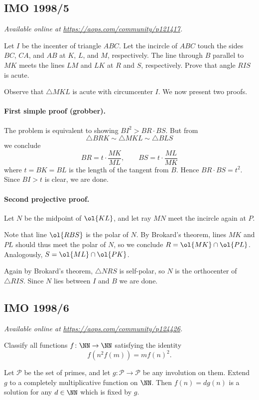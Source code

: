 \documentclass[11pt]{scrartcl}
\begin{document}
\subsection{IMO 1998/5}
\textsl{Available online at \url{https://aops.com/community/p121417}.}
\begin{mdframed}[style=mdpurplebox,frametitle={Problem statement}]
Let $I$ be the incenter of triangle $ABC$.
Let the incircle of $ABC$ touch
the sides $BC$, $CA$, and $AB$ at $K$, $L$, and $M$, respectively.
The line through $B$ parallel to $MK$ meets the lines
$LM$ and $LK$ at $R$ and $S$, respectively.
Prove that angle $RIS$ is acute.
\end{mdframed}
Observe that $\triangle MKL$ is acute with circumcenter $I$.
We now present two proofs.

\paragraph{First simple proof (grobber).}
The problem is equivalent to showing $BI^2 > BR \cdot BS$.
But from
\[ \triangle BRK \sim \triangle MKL \sim \triangle BLS \]
we conclude
\[ BR = t \cdot \frac{MK}{ML},
  \qquad BS = t \cdot \frac{ML}{MK} \]
where $t = BK  = BL$ is the length
of the tangent from $B$.
Hence $BR \cdot BS = t^2$.
Since $BI > t$ is clear, we are done.

\paragraph{Second projective proof.}
Let $N$ be the midpoint of $\ol{KL}$,
and let ray $MN$ meet the incircle again at $P$.

Note that line $\ol{RBS}$ is the polar of $N$.
By Brokard's theorem, lines $MK$ and $PL$ should thus
meet the polar of $N$, so we conclude $R = \ol{MK} \cap \ol{PL}$.
Analogously, $S = \ol{ML} \cap \ol{PK}$.

Again by Brokard's theorem, $\triangle NRS$ is self-polar,
so $N$ is the orthocenter of $\triangle RIS$.
Since $N$ lies between $I$ and $B$ we are done.
\pagebreak

\subsection{IMO 1998/6}
\textsl{Available online at \url{https://aops.com/community/p124426}.}
\begin{mdframed}[style=mdpurplebox,frametitle={Problem statement}]
Classify all functions $f \colon \NN \to \NN$
satisfying the identity
\[ f(n^2 f(m)) = m f(n)^2. \]
\end{mdframed}
Let $\mathcal P$ be the set of primes,
and let $g \colon \mathcal P \to \mathcal P$ be any involution on them.
Extend $g$ to a completely multiplicative function on $\NN$.
Then $f(n) = d g(n)$ is a solution for any $d \in \NN$
which is fixed by $g$.
\end{document}
